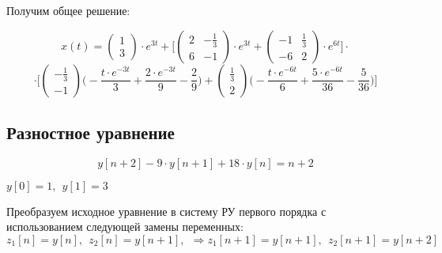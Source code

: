 Получим общее решение:

\begin{displaymath}
x(t) =
\begin{pmatrix}
1
\\
3
\end{pmatrix} \cdot e^{3t} + \Big [ \begin{pmatrix}
2 & - \frac{1}{3}
\\
6 & -1
\end{pmatrix} \cdot e^{3t} + \begin{pmatrix}
-1 & \frac{1}{3}
\\
-6 & 2
\end{pmatrix} \cdot e^{6t} \Big ] \cdot 
\end{displaymath}
\begin{displaymath}
\cdot \Big [  \begin{pmatrix}
- \frac{1}{3}
\\
- 1
\end{pmatrix} \Big ( - \frac{t \cdot e^{-3t}}{3} + \frac{2 \cdot e^{-3t}}{9} - \frac{2}{9} \Big ) + \begin{pmatrix}
\frac{1}{3}
\\
2 
\end{pmatrix} \Big ( - \frac{t \cdot e^{-6t}}{6} + \frac{5 \cdot e^{-6t}}{36} - \frac{5}{36} \Big) \Big ]
\end{displaymath}
\subsection{Разностное уравнение}

\begin{displaymath}
y[n+2] - 9 \cdot y[n+1] + 18 \cdot y[n] = n + 2
\end{displaymath}
\begin{center}
$y[0] = 1,\ \ y[1] = 3$
\end{center}

Преобразуем исходное уравнение в систему РУ первого порядка с использованием следующей замены переменных:
$z_1[n] = y[n],\ \ z_2[n] = y[n+1],\ \ \Rightarrow z_1[n+1] = y[n+1],\ \ z_2[n+1] = y[n+2]$


